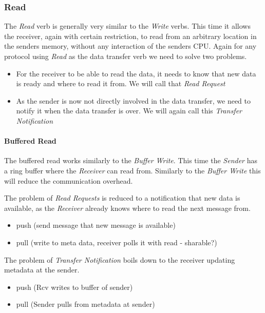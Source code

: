 \subsubsection{Read}
The \emph{Read} verb is generally very similar to the \emph{Write} verbs. This time it allows the receiver, again with certain
restriction, to read from an arbitrary location in the senders memory, without any interaction of the senders CPU. Again for
any protocol using \emph{Read} as the data transfer verb we need to solve two problems.

\begin{itemize}
  \item For the receiver to be able to read the data, it needs to know that new data is ready and where to read it from.
    We will call that \emph{Read Request}

  \item As the sender is now not directly involved in the data transfer, we need to notify it when the data transfer is 
over. We will again call this  \emph{Transfer Notification}
\end{itemize}

\paragraph{Buffered Read}


The buffered read works similarly to the \emph{Buffer Write}. This time the \emph{Sender} has a ring buffer where the 
\emph{Receiver} can read from. Similarly to the \emph{Buffer Write} this will reduce the communication overhead.

The problem of \emph{Read Requests} is reduced to a notification that new data is available, as the \emph{Receiver} already
knows where to read the next message from.

\begin{itemize}
  \item push (send message that new message is available)
  \item pull (write to meta data, receiver polls it with read - sharable?)
\end{itemize}


The problem of \emph{Transfer Notification} boils down to the receiver updating metadata at the sender.

\begin{itemize}
  \item push (Rcv writes to buffer of sender)
  \item pull (Sender pulls from metadata at sender)
\end{itemize}

